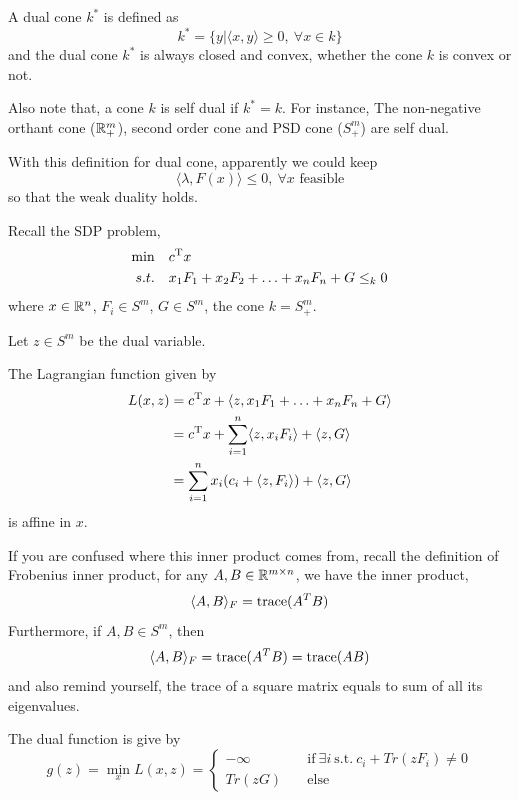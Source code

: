 A dual cone $k^*$ is defined as 
$$k^*=\{y| \langle x,y\rangle \geq 0,\ \forall x\in k \}$$
and the dual cone $k^*$ is always closed and convex, whether the cone $k$ is convex or not.

Also note that, a cone $k$ is self dual if $k^*=k$. For instance, The non-negative orthant cone ($\mathbb{R}_+^m$), second order cone and PSD cone ($S^m_+$) are self dual.

With this definition for dual cone, apparently we could keep 
\begin{equation*}
\langle \lambda, F(x)\rangle\leq 0,\ \forall x \text{ feasible}
\end{equation*}
so that the weak duality holds. 


\begin{example}
Recall the SDP problem,
\begin{align*}
\min\quad &c^{{\rm T}}x\\
s.t.\quad &x_1F_1+x_2F_2+\ldots+x_nF_n+G\leq_k 0
\end{align*}
where $x\in\mathbb{R}^n$, $F_i\in S^m$, $G\in S^m$, the cone $k=S^m_+$.


Let $z\in S^m$ be the dual variable.

The Lagrangian function given by
\begin{align*}
L(x,z) &= c^{{\rm T}}x + \langle z,x_1F_1+\ldots +x_nF_n+G\rangle \\
&= c^{{\rm T}}x + \sum^n_{i=1}\langle z,x_iF_i\rangle+\langle z,G\rangle\\
&= \sum^n_{i=1}x_i(c_i+\langle z, F_i\rangle)+\langle z,G\rangle
\end{align*}
is affine in $x$.

If you are confused where this inner product comes from, recall the definition of Frobenius inner product, for any $A, B\in\mathbb{R}^{m\times n}$, we have the inner product,
$$\langle A, B\rangle_F = \operatorname{trace} (A^T B)$$
Furthermore, if $A, B\in S^m$, then
$$\langle A, B\rangle_F = \operatorname{trace} (A^T B)=\operatorname{trace} (A B) $$
and also remind yourself, the trace of a square matrix equals to sum of all its eigenvalues.

The dual function is give by
\begin{equation*}
g(z) = \min_x L(x,z)=\left\{
\begin{aligned}
-\infty &\quad\text{if}\ \exists i\ \text{s.t.}\ c_i+Tr(zF_i)\neq 0 \\
Tr(zG) & \quad\text{else}
\end{aligned}
\right.
\end{equation*}


\end{example}
